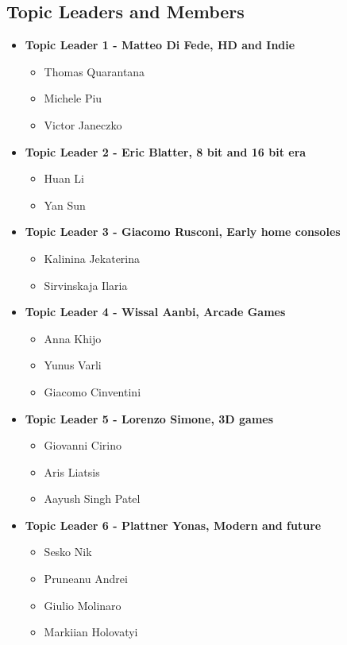\documentclass[a4paper,12pt]{article}
\begin{document}
\subsection*{Topic Leaders and Members}
\begin{itemize}[leftmargin=1.2cm, label={}]
    \item \textbf{Topic Leader 1 - Matteo Di Fede, HD and Indie}
    \begin{itemize}[leftmargin=1.5cm]
        \item Thomas Quarantana
        \item Michele Piu
        \item Victor Janeczko
    \end{itemize}

    \item \textbf{Topic Leader 2 - Eric Blatter, 8 bit and 16 bit era}
    \begin{itemize}[leftmargin=1.5cm]
        \item Huan Li
        \item Yan Sun
    \end{itemize}

    \item \textbf{Topic Leader 3 - Giacomo Rusconi, Early home consoles}
    \begin{itemize}[leftmargin=1.5cm]
        \item Kalinina Jekaterina
        \item Sirvinskaja Ilaria
    \end{itemize}
    
    \vspace{0.5cm}

    \item \textbf{Topic Leader 4 - Wissal Aanbi, Arcade Games}
    \begin{itemize}[leftmargin=1.5cm]
        \item Anna Khijo
        \item Yunus Varli
        \item Giacomo Cinventini
    \end{itemize}

    \item \textbf{Topic Leader 5 - Lorenzo Simone, 3D games}
    \begin{itemize}[leftmargin=1.5cm]
        \item Giovanni Cirino
        \item Aris Liatsis
        \item Aayush Singh Patel
    \end{itemize}

    \item \textbf{Topic Leader 6 - Plattner Yonas, Modern and future}
    \begin{itemize}[leftmargin=1.5cm]
        \item Sesko Nik
        \item Pruneanu Andrei
        \item Giulio Molinaro
        \item Markiian Holovatyi
    \end{itemize}
\end{itemize}
\end{document}
